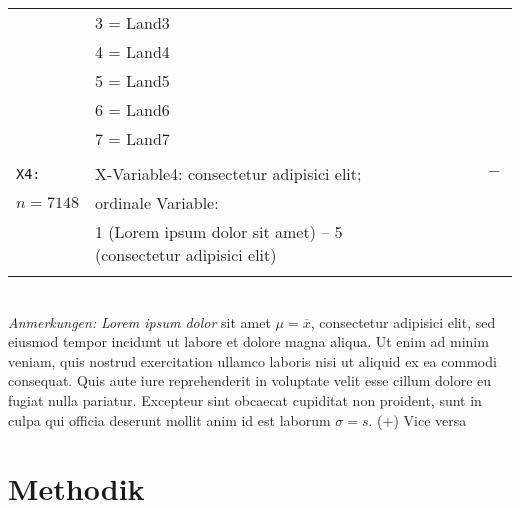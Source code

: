 \documentclass[12pt, a4paper, oneside]{article}
\begin{document}
\begin{table}[!htbp]
\begin{tabularx}{\columnwidth}{XXl}
& 3 = Land3 &\\
& 4 = Land4 &\\
& 5 = Land5 &\\
& 6 = Land6 &\\
& 7 = Land7 &\\
\\
\hline
\texttt{X4:}   & X-Variable4: consectetur adipisici elit; & $\qquad \qquad  \qquad  -$ \\
$n=7148$ &ordinale Variable:&\\
&1 (Lorem ipsum dolor sit amet) -- 5 (consectetur adipisici elit)&\\
\\
\hline 
\end{tabularx} 
\\
\tiny{\emph{Anmerkungen:} \emph{Lorem ipsum dolor} sit amet $\mu=\overline{x}$, consectetur adipisici elit, sed eiusmod tempor incidunt ut labore et dolore magna aliqua. Ut enim ad minim veniam, quis nostrud exercitation ullamco laboris nisi ut aliquid ex ea commodi consequat. Quis aute iure reprehenderit in voluptate velit esse cillum dolore eu fugiat nulla pariatur. Excepteur sint obcaecat cupiditat non proident, sunt in culpa qui officia deserunt mollit anim id est laborum $\sigma=s$. (+) Vice versa}
\end{table}
\newpage

\section{Methodik}
\end{document}
